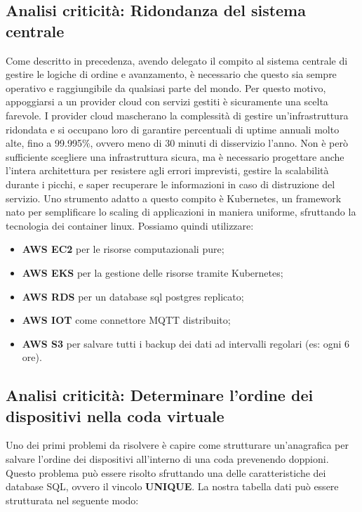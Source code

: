 \documentclass[a4paper, titlepage, 12pt, openright, oneside]{book}
\begin{document}
\subsection{Analisi criticità: Ridondanza del sistema centrale}

Come descritto in precedenza, avendo delegato il compito al sistema centrale di gestire le logiche di ordine e avanzamento, è necessario che questo sia sempre operativo
e raggiungibile da qualsiasi parte del mondo. Per questo motivo, appoggiarsi a un provider cloud con servizi gestiti è sicuramente una scelta farevole. I provider cloud mascherano
la complessità di gestire un'infrastruttura ridondata e si occupano loro di garantire percentuali di uptime annuali molto alte, fino a 99.995\%, ovvero meno di 30 minuti di disservizio l'anno. Non è però sufficiente scegliere una infrastruttura sicura, ma è necessario progettare anche l'intera architettura per resistere agli errori imprevisti, gestire la scalabilità durante i picchi, e saper recuperare le informazioni in caso di distruzione del servizio. Uno strumento adatto a questo compito è Kubernetes, un framework nato per semplificare lo scaling di applicazioni in maniera uniforme, sfruttando la tecnologia dei container linux. Possiamo quindi utilizzare:
\begin{itemize}
	\item \textbf{AWS EC2} per le risorse computazionali pure;
	\item \textbf{AWS EKS} per la gestione delle risorse tramite Kubernetes;
	\item \textbf{AWS RDS} per un database sql postgres replicato;
	\item \textbf{AWS IOT} come connettore MQTT distribuito;
	\item \textbf{AWS S3} per salvare tutti i backup dei dati ad intervalli regolari (es: ogni 6 ore).
\end{itemize}

\subsection{Analisi criticità: Determinare l'ordine dei dispositivi nella coda virtuale}

Uno dei primi problemi da risolvere è capire come strutturare un'anagrafica per salvare l'ordine dei dispositivi all'interno di una coda prevenendo doppioni.
Questo problema può essere risolto sfruttando una delle caratteristiche dei database SQL, ovvero il vincolo \textbf{UNIQUE}.
La nostra tabella dati può essere strutturata nel seguente modo:
\end{document}
